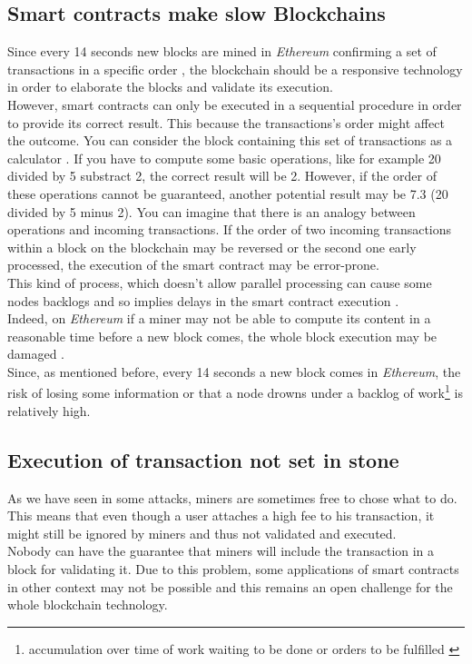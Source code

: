 \subsection{Smart contracts make slow Blockchains}
Since every 14 seconds new blocks are mined in \textit{Ethereum} \cite{sina} confirming a set of transactions in a specific order \cite{challenge3}, the blockchain should be a responsive technology in order to elaborate the blocks and validate its execution. \\
However, smart contracts can only be executed in a sequential procedure \cite{challenge3} in order to provide its correct result. This because the transactions's order might affect the outcome. You can consider the block containing this set of transactions as a calculator \cite{challenge1}. If you have to compute some basic operations, like for example 20 divided by 5 substract 2, the correct result will be 2. However, if the order of these operations cannot be guaranteed, another potential result may be 7.3 (20 divided by 5 minus 2). 
You can imagine that there is an analogy between operations and incoming transactions. If the order of two incoming transactions within a block on the blockchain may be reversed or the second one early processed, the execution of the smart contract may be error-prone. \\
This kind of process, which doesn't allow parallel processing can cause some nodes backlogs and so implies delays in the smart contract execution \cite{challenge1}. \\
Indeed, on \textit{Ethereum} if a miner may not be able to compute its content in a reasonable time before a new block comes, the whole block execution may be damaged \cite{challenge1}. \\
Since, as mentioned before, every 14 seconds a new block comes in \textit{Ethereum}, the risk of losing some information or that a node drowns under a backlog of work\footnote{accumulation over time of work waiting to be done or orders to be fulfilled \cite{challenge4}} is relatively high.

\subsection{Execution of transaction not set in stone}
As we have seen in some attacks, miners are sometimes free to chose what to do. This means that even though a user attaches a high fee to his transaction, it might still be ignored by miners and thus not validated and executed.\\
Nobody can have the guarantee that miners will include the transaction in a block for validating it.
Due to this problem, some applications of smart contracts in other context may not be possible and this remains an open challenge for the whole blockchain technology. 

